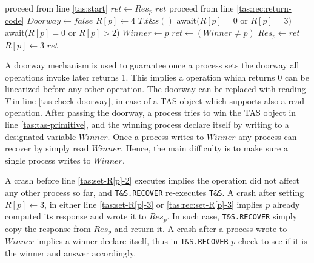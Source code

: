 \begin{algorithm}[b]
\begin{multicols}{2}
\begin{algorithmic}[1]
			 \label{tas:rec:start}
			\State proceed from line \ref{tas:start}
			\EndIf
			 \label{tas:rec:return-operation-done}
			\State $ret \gets Res_p$
			\State \Return $ret$
			\EndIf
			 \label{tas:rec:check-winner}
			\State proceed from line \ref{tas:rec:return-code}
			\EndIf
			\State $Doorway \gets false$ \label{tas:rec:close-doorway}
			\State $R[p] \gets 4$ \label{tas:rec:set-R[p]-4}
			\State $T.t\&s()$ \label{tas:rec:tas-primitive}
			 \label{tas:rec:wait-lower-id}
			\State await($R[p] = 0$ or $R[p] = 3$)
			\EndFor
			 \label{tas:rec:wait-higher-id}
			\State await($R[p] = 0$ or $R[p]>2$)
			\EndFor
			 \label{tas:rec:winner-not-overwrite}
			\State $Winner \gets p$ \label{tas:rec:write-winner}
			\EndIf
			\State $ret \gets (Winner \neq p)$ \label{tas:rec:return-code}
			\State $Res_p \gets ret$
			\State $R[p] \gets 3$ \label{tas:rec:set-R[p]-3}
			\State \Return $ret$
			\EndProcedure
		\end{algorithmic}
	\end{multicols}
\end{algorithm}


A doorway mechanism is used to guarantee once a process sets the doorway all operations invoke later returns 1. This implies a operation which returns 0 can be linearized before any other operation. The doorway can be replaced with reading $T$ in line \ref{tas:check-doorway}, in case of a TAS object which supports also a read operation.
After passing the doorway, a process tries to win the TAS object in line \ref{tas:tas-primitive}, and the winning process declare itself by writing to a designated variable $Winner$. Once a process writes to $Winner$ any process can recover by simply read $Winner$. Hence, the main difficulty is to make sure a single process writes to $Winner$.

A crash before line \ref{tas:set-R[p]-2} executes implies the operation did not affect any other process so far, and \texttt{T\&S.RECOVER} re-executes \texttt{T\&S}. A crash after setting $R[p] \gets 3$, in either line \ref{tas:set-R[p]-3} or \ref{tas:rec:set-R[p]-3} implies $p$ already computed its response and wrote it to $Res_p$. In such case, \texttt{T\&S.RECOVER} simply copy the response from $Res_p$ and return it. A crash after a process wrote to $Winner$ implies a winner declare itself, thus in \texttt{T\&S.RECOVER} $p$ check to see if it is the winner and answer accordingly.

